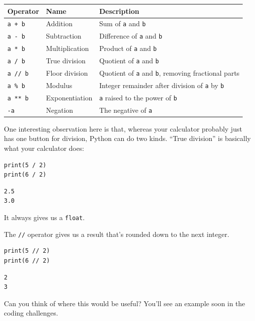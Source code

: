 \bigskip\noindent
\begin{tabular}{p{}p{}p{}}
\toprule
Operator & Name & Description \\
\hline
\texttt{a + b} & Addition & Sum of \texttt{a} and \texttt{b} \\
\texttt{a - b} & Subtraction & Difference of \texttt{a} and \texttt{b} \\
\texttt{a * b} & Multiplication & Product of \texttt{a} and \texttt{b} \\
\texttt{a / b} & True division & Quotient of \texttt{a} and \texttt{b} \\
\texttt{a // b} & Floor division & Quotient of \texttt{a} and \texttt{b}, removing fractional parts \\
\texttt{a \% b} & Modulus & Integer remainder after division of \texttt{a} by \texttt{b} \\
\texttt{a ** b} & Exponentiation & \texttt{a} raised to the power of \texttt{b} \\
\texttt{-a} & Negation & The negative of \texttt{a} \\
\bottomrule
\end{tabular}

\bigskip

One interesting observation here is that, whereas your calculator probably just has one button for division, Python can do two kinds. ``True division'' is basically what your calculator does:

\begin{verbatim}
print(5 / 2)
print(6 / 2)
\end{verbatim}

\begin{verbatim}
2.5
3.0
\end{verbatim}

It always gives us a \texttt{float}.

The \texttt{//} operator gives us a result that's rounded down to the next integer.

\begin{verbatim}
print(5 // 2)
print(6 // 2)
\end{verbatim}

\begin{verbatim}
2
3
\end{verbatim}

Can you think of where this would be useful? You'll see an example soon in the coding challenges.

